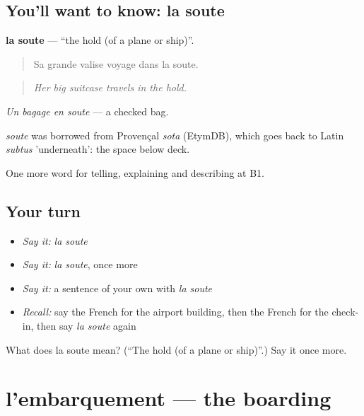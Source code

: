 \subsection*{You'll want to know: la soute}
\textbf{la soute} — \textquotedblleft{}the hold (of a plane or ship)\textquotedblright{}.

\begin{quote}
Sa grande valise voyage dans la soute.
\end{quote}

\begin{quote}
\emph{Her big suitcase travels in the hold.}
\end{quote}

\emph{Un bagage en soute} — a checked bag.

\begin{cousinweb}
\emph{soute} was borrowed from Provençal \emph{sota} (EtymDB), which goes back to Latin \emph{subtus} 'underneath': the space below deck.
\end{cousinweb}

\begin{grammarlens}[title={What you've built}]
One more word for telling, explaining and describing at B1.
\end{grammarlens}

\subsection*{Your turn}
\begin{itemize}
\raggedright
  \item \emph{Say it:} \emph{la soute}
  \item \emph{Say it:} \emph{la soute}, once more
  \item \emph{Say it:} a sentence of your own with \emph{la soute}
  \item \emph{Recall:} say the French for the airport building, then the French for the check-in, then say \emph{la soute} again
\end{itemize}

\begin{tcolorbox}[breakable,colback=teal!4,colframe=teal!35!black,title={Before you move on}]
What does la soute mean? (\textquotedblleft{}The hold (of a plane or ship)\textquotedblright{}.) Say it once more.
\end{tcolorbox}
\section[l'embarquement]{l'embarquement — the boarding}

